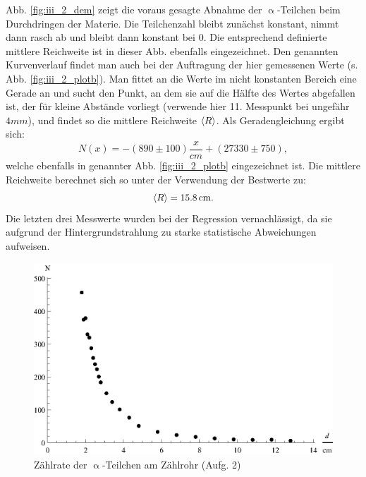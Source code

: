 Abb. \ref{fig:iii_2_dem} zeigt die voraus gesagte Abnahme der $\upalpha$-Teilchen beim Durchdringen der Materie. Die Teilchenzahl bleibt zunächst konstant, nimmt dann rasch ab und bleibt dann konstant bei 0. Die entsprechend definierte mittlere Reichweite ist in dieser Abb. ebenfalls  eingezeichnet. Den genannten Kurvenverlauf findet man auch bei der Auftragung der hier gemessenen Werte (s. Abb. \ref{fig:iii_2_plotb}). Man fittet an die Werte im nicht konstanten Bereich eine Gerade an und sucht den Punkt, an dem sie auf die Hälfte des Wertes abgefallen ist, der für kleine Abstände vorliegt (verwende hier 11. Messpunkt bei ungefähr $\si{4}{mm}$), und findet so die mittlere Reichweite $\left\langle R \right\rangle$. Als Geradengleichung ergibt sich:
\begin{equation}
N(x) = -(890 \pm 100)\frac{x}{\si{cm}} + (27330 \pm 750),
\end{equation}
welche ebenfalls in genannter Abb. \ref{fig:iii_2_plotb} eingezeichnet ist. Die mittlere Reichweite berechnet sich so unter der Verwendung der Bestwerte zu:
\begin{equation}
\left\langle R \right\rangle = \SI{15,8}{cm}.
\end{equation}
Die letzten drei Messwerte wurden bei der Regression vernachlässigt, da sie aufgrund der Hintergrundstrahlung zu starke statistische Abweichungen aufweisen.

\begin{figure}[ht]
\centering
\includegraphics[scale=1.0]{fig/iii_2_plota.eps}
\caption{Zählrate der $\upalpha$-Teilchen am Zählrohr (Aufg. 2)}
\label{fig:iii_2_plota}
\end{figure}


